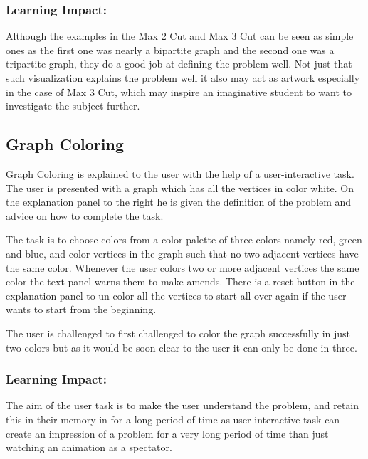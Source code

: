\subsubsection{Learning Impact:}
Although the examples in the Max 2 Cut and Max 3 Cut can be seen as simple ones
as the first one was nearly a bipartite graph and the second one was a
tripartite graph, they do a good job at defining the problem well. 
Not just that such visualization explains the problem well it also may act
as artwork especially in the case of Max 3 Cut, which may inspire an
imaginative student to want to investigate the subject further.


\subsection{Graph Coloring}
Graph Coloring is explained to the user with the help of a user-interactive
task.  The user is presented with a graph which has all the vertices in color
white.  On the explanation panel to the right he is given the definition of the
problem and advice on how to complete the task.  

The task is to choose colors from a color palette of three colors namely red,
green and blue, and color vertices in the graph such that no two adjacent
vertices have the same color. Whenever the user colors two or more adjacent
vertices the same color the text panel warns them to make amends. There is a
reset button in the explanation panel to un-color all the vertices to start all
over again if the user wants to start from the beginning. 

The user is challenged to first challenged to color the graph successfully in
just two colors but as it would be soon clear to the user it can only be done
in three.

\subsubsection{Learning Impact:}
The aim of the user task is to make the user understand the problem, and retain
this in their memory in for a long period of time as user interactive task can
create an impression of a problem for a very long period of time than just
watching an animation as a spectator.

